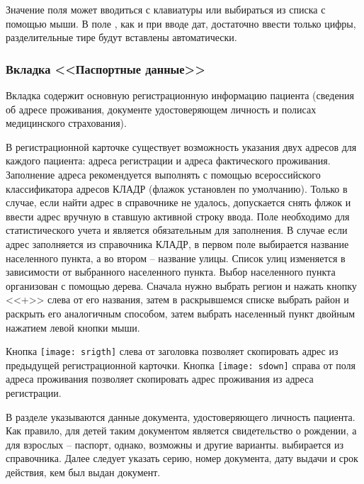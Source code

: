 Значение поля  может вводиться с клавиатуры или выбираться из списка с помощью мыши. В поле , как и при вводе дат, достаточно ввести только цифры, разделительные тире будут вставлены автоматически.

\subsubsection{Вкладка <<Паспортные данные>>}

Вкладка  содержит основную регистрационную информацию пациента (сведения об адресе проживания, документе удостоверяющем личность и полисах медицинского страхования).

В регистрационной карточке существует возможность указания двух адресов для каждого пациента: адреса регистрации и адреса фактического проживания. Заполнение адреса рекомендуется выполнять с помощью всероссийского классификатора адресов КЛАДР (флажок  установлен по умолчанию). Только в случае, если найти адрес в справочнике не удалось, допускается снять флжок  и ввести адрес вручную в ставшую активной строку ввода. Поле  необходимо для статистического учета и является обязательным для заполнения. В случае если адрес заполняется из справочника КЛАДР, в первом поле выбирается название населенного пункта, а во втором – название улицы. Список улиц изменяется в зависимости от выбранного населенного пункта. Выбор населенного пункта организован с помощью дерева. Сначала нужно выбрать регион и нажать кнопку <<+>> слева от его названия, затем в раскрывшемся списке выбрать район и раскрыть его аналогичным способом, затем выбрать населенный пункт двойным нажатием левой кнопки мыши.

\begin{prim}
Кнопка \texttt{[image: srigth]} слева от заголовка  позволяет скопировать адрес из предыдущей регистрационной карточки. Кнопка \texttt{[image: sdown]} справа от поля  адреса проживания позволяет скопировать адрес проживания из адреса регистрации.
\end{prim}

В разделе  указываются данные документа, удостоверяющего личность пациента. Как правило, для детей таким документом является свидетельство о рождении, а для взрослых – паспорт, однако, возможны и другие варианты.  выбирается из справочника. Далее следует указать серию, номер документа, дату выдачи и срок действия, кем был выдан документ.


